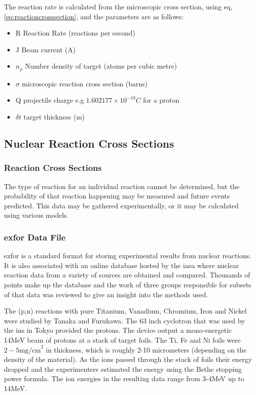 The reaction rate is calculated from the microscopic cross section, using eq, \ref{eq:reactioncrosssection}, and the parameters are as follows:

\begin{itemize}
\item R	Reaction Rate (reactions per second)
\item J	Beam current (A)
\item $n_{\rho}$	Number density of target (atoms per cubic metre)
\item $\sigma$ microscopic reaction cross section (barns)
\item Q projectile charge e.g $1.602177\times 10^{-19}C$ for a proton 
\item $\delta t$	target thickness (m)
\end{itemize}





\subsection{Nuclear Reaction Cross Sections}
\label{section:nuclearxs}
\subsubsection{Reaction Cross Sections}

The type of reaction for an individual reaction cannot be determined, but the probability of that reaction happening may be measured and future events predicted.  This data may be gathered experimentally, or it may be calculated using various models.


\FloatBarrier

\subsubsection{\Acrlong{exfor} Data File}
\label{section:exfordata}

\Acrfull{exfor} is a standard format for storing experimental results from nuclear reactions\cite{exforarticle}.  It is also associated with an online database hosted by the \acrfull{iaea} where nuclear reaction data from a variety of sources are obtained and compared. Thousands of points make up the database and the work of three groups responsible for subsets of that data was reviewed to give an insight into the methods used.

The (p,n) reactions with pure Titanium, Vanadium, Chromium, Iron and Nickel were studied by Tanaka and Furukawa\cite{exfortanaka}.  The 63 inch cyclotron that was used by the \acrfull{ins} in Tokyo provided the protons.  The device output a mono-energetic 14MeV beam of protons at a stack of target foils.  The Ti, Fe and Ni foils were $2-5 \text{mg/cm}^{2}$ in thickness, which is roughly 2-10 micrometers (depending on the density of the material).  As the ions passed through the stack of foils their energy dropped and the experimenters estimated the energy using the Bethe stopping power formula\cite{stoppingdistance}.  The ion energies in the resulting data range from 3-4MeV up to 14MeV.

